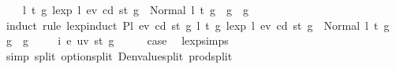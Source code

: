 \begin{isabellebody}
\ \ \ \ {\isachardoublequoteopen}{\isasymforall}l{}{\isacharprime}{\kern0pt}\ t{}{\isacharprime}{\kern0pt}\ g{}{\isacharprime}{\kern0pt}{\isachardot}{\kern0pt}\ lexp\ l{}\ ev{}\ cd{}\ st{}\ g{}\ {\isacharequal}{\kern0pt}\ Normal\ {\isacharparenleft}{\kern0pt}{\isacharparenleft}{\kern0pt}l{}{\isacharprime}{\kern0pt}{\isacharcomma}{\kern0pt}\ t{}{\isacharprime}{\kern0pt}{\isacharparenright}{\kern0pt}{\isacharcomma}{\kern0pt}\ g{}{\isacharprime}{\kern0pt}{\isacharparenright}{\kern0pt}\ {\isasymlongrightarrow}\ g{}{\isacharprime}{\kern0pt}\ {\isasymle}\ g{}{\isachardoublequoteclose}\isanewline
%
\isadelimproof
%
\endisadelimproof
%
\isatagproof
{}\isamarkupfalse%
\ {\isacharparenleft}{\kern0pt}induct\ rule{\isacharcolon}{\kern0pt}\ lexp{\isachardot}{\kern0pt}induct{\isacharbrackleft}{\kern0pt}\ {\isacharquery}{\kern0pt}P{\isacharequal}{\kern0pt}{\isachardoublequoteopen}{\isasymlambda}l{}\ ev{}\ cd{}\ st{}\ g{}{\isachardot}{\kern0pt}\ {\isacharparenleft}{\kern0pt}{\isasymforall}l{}{\isacharprime}{\kern0pt}\ t{}{\isacharprime}{\kern0pt}\ g{}{\isacharprime}{\kern0pt}{\isachardot}{\kern0pt}\ lexp\ l{}\ ev{}\ cd{}\ st{}\ g{}\ {\isacharequal}{\kern0pt}\ Normal\ {\isacharparenleft}{\kern0pt}{\isacharparenleft}{\kern0pt}l{}{\isacharprime}{\kern0pt}{\isacharcomma}{\kern0pt}\ t{}{\isacharprime}{\kern0pt}{\isacharparenright}{\kern0pt}{\isacharcomma}{\kern0pt}\ g{}{\isacharprime}{\kern0pt}{\isacharparenright}{\kern0pt}\ {\isasymlongrightarrow}\ g{}{\isacharprime}{\kern0pt}\ {\isasymle}\ g{}{\isacharparenright}{\kern0pt}{\isachardoublequoteclose}{\isacharbrackright}{\kern0pt}{\isacharparenright}{\kern0pt}\isanewline
\ \ \isamarkupfalse%
\ {\isacharparenleft}{\kern0pt}{}\ i\ e\ uv\ st\ g{\isacharparenright}{\kern0pt}\isanewline
\ \ \isamarkupfalse%
\ \isamarkupfalse%
\ {\isacharquery}{\kern0pt}case\ \isamarkupfalse%
\ lexp{\isachardot}{\kern0pt}simps{\isacharparenleft}{\kern0pt}{}{\isacharparenright}{\kern0pt}\ \isamarkupfalse%
\ {\isacharparenleft}{\kern0pt}simp\ split{\isacharcolon}{\kern0pt}\ option{\isachardot}{\kern0pt}split\ Denvalue{\isachardot}{\kern0pt}split\ prod{\isachardot}{\kern0pt}split{\isacharparenright}{\kern0pt}\isanewline

\end{isabellebody}
